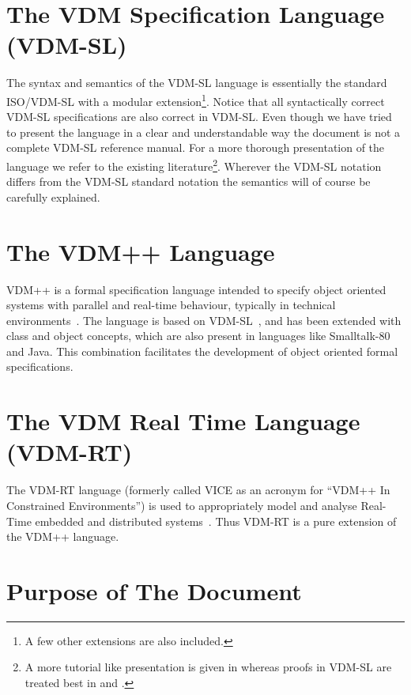 \documentclass{overturerepchap}
\begin{document}
\section{The VDM Specification Language (VDM-SL)}

The syntax and semantics of the VDM-SL
language is essentially the standard ISO/VDM-SL \cite{ISOVDM96}
with a modular extension\footnote{A few other extensions are also included.}.
Notice that all syntactically correct VDM-SL specifications are also correct in
 VDM-SL. 
Even though we have tried to present the language in a
clear and understandable way the document is not a complete VDM-SL
reference manual. 
For a more thorough presentation of the language we refer to the
existing literature\footnote{A more tutorial like
presentation is given in \cite{Fitzgerald&98} whereas proofs in VDM-SL
are treated best in \cite{Jones90a} and \cite{Bicarregui&94}.}.
Wherever the  VDM-SL notation differs from
the VDM-SL standard notation the semantics will of course be carefully
explained.

\section{The VDM++ Language}

VDM++ is a formal specification language intended to specify object
oriented systems with parallel and real-time behaviour, typically in
technical environments~\cite{Fitzgerald&05}.  The language is based on
VDM-SL~\cite{ISOVDM96}, and has been extended with class and object
concepts, which are also present in languages like Smalltalk-80 and
Java.  This combination facilitates the development of object oriented
formal specifications.

\section{The VDM Real Time Language (VDM-RT)}

The VDM-RT language (formerly called VICE as an acronym for ``VDM++ In
Constrained Environments'') is used to appropriately model and analyse
Real-Time embedded and distributed
systems~\cite{Mukherjee&00,Verhoef&06b,Verhoef&07,Verhoef08,Larsen&09b}. Thus
VDM-RT is a pure extension of the VDM++ language.


\section{Purpose of The Document}
\end{document}

